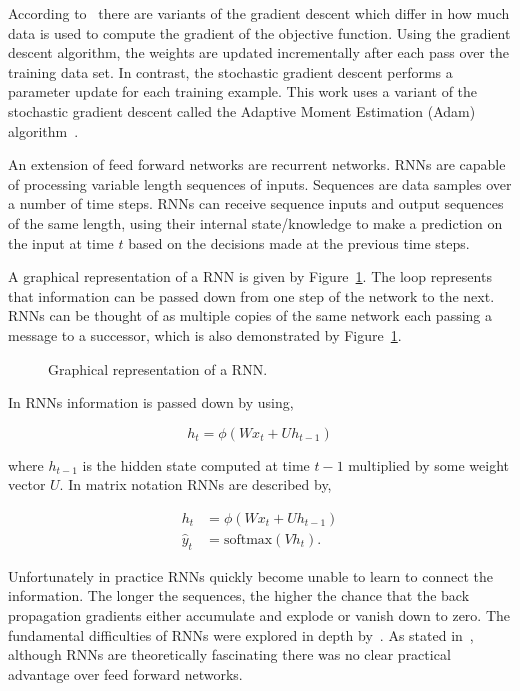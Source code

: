 According to~\cite{Ruder2016} there are variants of the gradient descent which
differ in how much data is used to compute the gradient of the objective
function. Using the gradient descent algorithm, the weights are updated
incrementally after each pass over the training data set. In contrast, the
stochastic gradient descent performs a parameter update for each training
example. This work uses a variant of the stochastic gradient descent called the
Adaptive Moment Estimation (Adam) algorithm~\cite{Kingma2014}.

An extension of feed forward networks are recurrent networks. RNNs are
capable of processing variable length sequences of inputs. Sequences are data
samples over a number of time steps. RNNs can receive sequence inputs and output
sequences of the same length, using their internal state/knowledge to make a
prediction on the input at time \(t\) based on the decisions made at the
previous time steps.

A graphical representation of a RNN is given by
Figure~\ref{fig:rnn}. The loop represents that information can be passed
down from one step of the network to the next. RNNs can be thought of as
multiple copies of the same network each passing a message to a successor, which
is also demonstrated by Figure~\ref{fig:rnn}.

\begin{figure}[!htbp]
    \centering
    
    \caption{Graphical representation of a RNN.}\label{fig:rnn}
\end{figure}

In RNNs information is passed down by using,

\begin{equation*}
    h_t = \phi(Wx_t + Uh_{t-1})
\end{equation*}

where \(h_{t-1}\) is the hidden state computed at time \(t-1\) multiplied by
some weight vector \(U\). In matrix notation RNNs are described by,

\begin{align}\label{eq:recurrent_neural_network_equations}
    h_t & = \phi(Wx_t + Uh_{t-1}) \\
    \hat{y}_t & = \text{softmax}(Vh_t).
\end{align}

Unfortunately in practice RNNs quickly become unable to learn to connect the
information. The longer the sequences, the higher the chance that
the back propagation gradients either accumulate and explode or vanish down to
zero. The fundamental difficulties of RNNs were explored in depth
by~\cite{Bengio1994}. As stated in~\cite{Hochreiter1997}, although RNNs are
theoretically fascinating there was no clear practical advantage over feed
forward networks.

